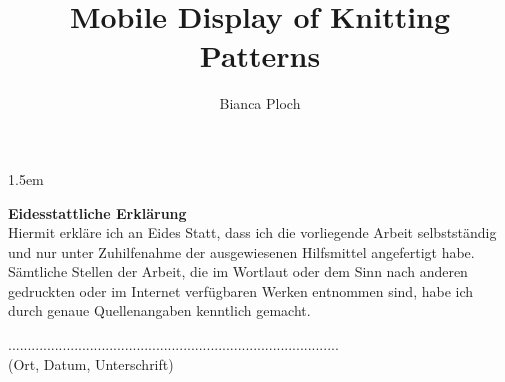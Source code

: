 \author{Bianca Ploch}
\title{Mobile Display of Knitting Patterns}




\makeglossaries




% 






\newpage
\printglossary[type=\acronymtype,title={Abbreviations}]

\newpage 
\sloppy %
\emergencystretch 1.5em %
\listoffigures

\newpage
\lstlistoflistings

\printbibliography

\begin{appendix}
   \clearpage
   
\end{appendix}

\newpage
\thispagestyle{empty}

\noindent \textbf{Eidesstattliche Erklärung}\\

\noindent Hiermit erkläre ich an Eides Statt, dass ich die vorliegende Arbeit selbstständig und nur unter
Zuhilfenahme der ausgewiesenen Hilfsmittel angefertigt habe.
Sämtliche Stellen der Arbeit, die im Wortlaut oder dem Sinn nach anderen gedruckten oder
im Internet verfügbaren Werken entnommen sind, habe ich durch genaue Quellenangaben
kenntlich gemacht.

\vspace*{1.5cm}
\noindent .....................................................................................\\
(Ort, Datum, Unterschrift)

